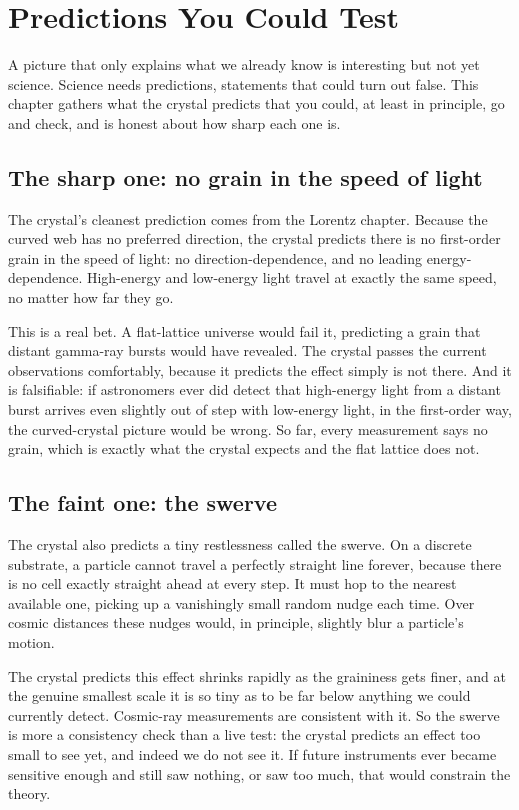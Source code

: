 \section{Predictions You Could Test}

A picture that only explains what we already know is interesting but not yet science. Science needs predictions, statements that could turn out false. This chapter gathers what the crystal predicts that you could, at least in principle, go and check, and is honest about how sharp each one is.

\subsection{The sharp one: no grain in the speed of light}

The crystal's cleanest prediction comes from the Lorentz chapter. Because the curved web has no preferred direction, the crystal predicts there is no first-order grain in the speed of light: no direction-dependence, and no leading energy-dependence. High-energy and low-energy light travel at exactly the same speed, no matter how far they go.

This is a real bet. A flat-lattice universe would fail it, predicting a grain that distant gamma-ray bursts would have revealed. The crystal passes the current observations comfortably, because it predicts the effect simply is not there. And it is falsifiable: if astronomers ever did detect that high-energy light from a distant burst arrives even slightly out of step with low-energy light, in the first-order way, the curved-crystal picture would be wrong. So far, every measurement says no grain, which is exactly what the crystal expects and the flat lattice does not.

\subsection{The faint one: the swerve}

The crystal also predicts a tiny restlessness called the swerve. On a discrete substrate, a particle cannot travel a perfectly straight line forever, because there is no cell exactly straight ahead at every step. It must hop to the nearest available one, picking up a vanishingly small random nudge each time. Over cosmic distances these nudges would, in principle, slightly blur a particle's motion.

The crystal predicts this effect shrinks rapidly as the graininess gets finer, and at the genuine smallest scale it is so tiny as to be far below anything we could currently detect. Cosmic-ray measurements are consistent with it. So the swerve is more a consistency check than a live test: the crystal predicts an effect too small to see yet, and indeed we do not see it. If future instruments ever became sensitive enough and still saw nothing, or saw too much, that would constrain the theory.

